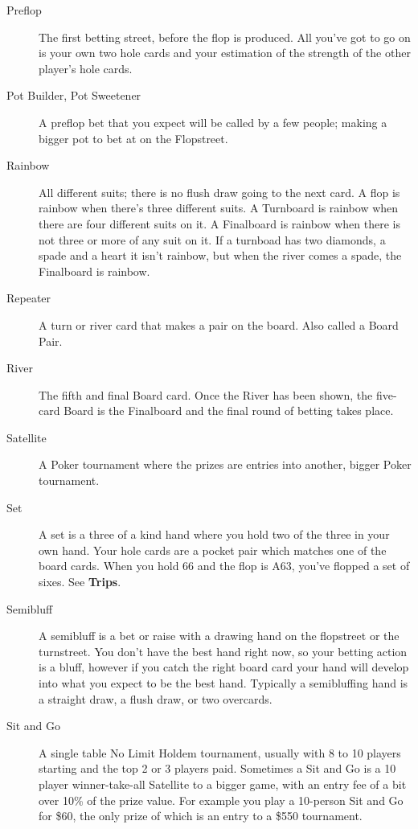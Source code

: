 \begin{description}
\item[Preflop] The first betting street, before the flop is produced.
All you've got to go on is your own two hole cards and your estimation
of the strength of the other player's hole cards.

\item[Pot Builder, Pot Sweetener] A preflop bet that you expect will
be called by a few people; making a bigger pot to bet at on the
Flopstreet.

\item[Rainbow] All different suits; there is no flush
draw going to the next card. A flop is rainbow when there's three
different suits. A Turnboard is rainbow when there are four different
suits on it. A Finalboard is rainbow when there is not
three or more of any suit on it. If a turnboad has two diamonds, a
spade and a heart it isn't rainbow, but when the river comes a spade,
the Finalboard is rainbow.

\item[Repeater] A turn or river card that makes a pair on the
board. Also called a Board Pair.

\item[River] The fifth and final Board card. Once the River has been
shown, the five-card Board is the Finalboard and the final round of
betting takes place.

\item[Satellite] A Poker tournament where the prizes are entries into
another, bigger Poker tournament.

\item[Set] A set is a three of a kind hand where you hold two of the
three in your own hand. Your hole cards are a pocket pair which
matches one of the board cards. When you hold 66 and the flop is A63,
you've flopped a set of sixes. See \textbf{Trips}.

\item[Semibluff] A semibluff is a bet or raise with a drawing hand on
the flopstreet or the turnstreet. You don't have the best hand right
now, so your betting action is a bluff, however if you catch the right
board card your hand will develop into what you expect to be the best
hand. Typically a semibluffing hand is a straight draw, a flush draw,
or two overcards.

\item[Sit and Go] A single table No Limit Holdem tournament, usually
with 8 to 10 players starting and the top 2 or 3 players
paid. Sometimes a Sit and Go is a 10 player winner-take-all
Satellite to a bigger game, with an entry fee of a
bit over 10\% of the prize value. For example you play a 10-person
Sit and Go for \$60, the only prize of which is an entry to a \$550
tournament.


\end{description}
